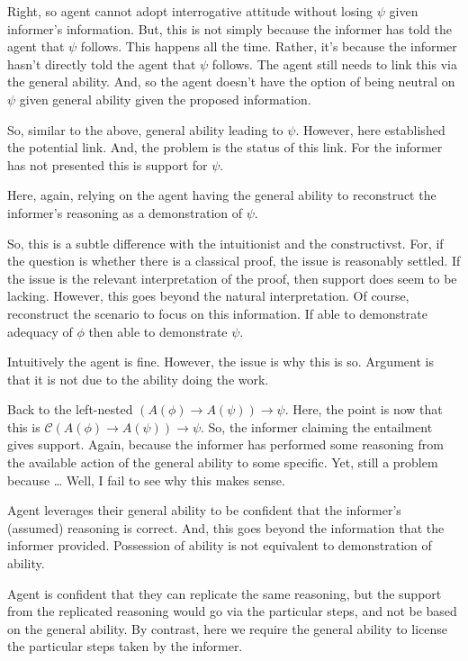\documentclass[10pt]{article}
\newcommand{\hozlinedash}[0]{%
  \noindent\hdashrule[0.5ex][c]{\textwidth}{.1pt}{2.5pt}
}
\begin{document}
Right, so agent cannot adopt interrogative attitude without losing \(\psi\) given informer's information.
But, this is not simply because the informer has told the agent that \(\psi\) follows.
This happens all the time.
Rather, it's because the informer hasn't directly told the agent that \(\psi\) follows.
The agent still needs to link this via the general ability.
And, so the agent doesn't have the option of being neutral on \(\psi\) given general ability given the proposed information.

So, similar to the above, general ability leading to \(\psi\).
However, here established the potential link.
And, the problem is the status of this link.
For the informer has not presented this is support for \(\psi\).

Here, again, relying on the agent having the general ability to reconstruct the informer's reasoning as a demonstration of \(\psi\).

So, this is a subtle difference with the intuitionist and the constructivst.
For, if the question is whether there is a classical proof, the issue is reasonably settled.
If the issue is the relevant interpretation of the proof, then support does seem to be lacking.
However, this goes beyond the natural interpretation.
Of course, reconstruct the scenario to focus on this information.
If able to demonstrate adequacy of \(\phi\) then able to demonstrate \(\psi\).

Intuitively the agent is fine.
However, the issue is why this is so.
Argument is that it is not due to the ability doing the work.

\hozlinedash

Back to the left-nested \((A(\phi) \rightarrow A(\psi)) \rightarrow \psi\).
Here, the point is now that this is \(\mathcal{C}(A(\phi) \rightarrow A(\psi)) \rightarrow \psi\).
So, the informer claiming the entailment gives support.
Again, because the informer has performed some reasoning from the available action of the general ability to some specific.
Yet, still a problem because \dots
Well, I fail to see why this makes sense.

\hozlinedash

Agent leverages their general ability to be confident that the informer's (assumed) reasoning is correct.
And, this goes beyond the information that the informer provided.
Possession of ability is not equivalent to demonstration of ability.

Agent is confident that they can replicate the same reasoning, but the support from the replicated reasoning would go via the particular steps, and not be based on the general ability.
By contrast, here we require the general ability to license the particular steps taken by the informer.
\end{document}
